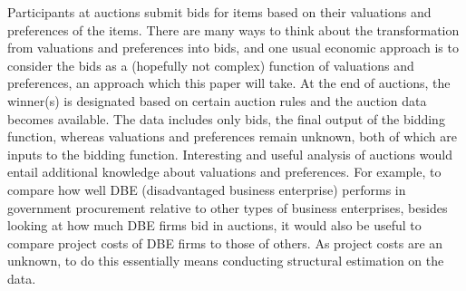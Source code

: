 \documentclass[11pt]{article}
\begin{document}




Participants at auctions submit bids for items based on their valuations and 
preferences of the items. There are many ways to think about the transformation from 
valuations and preferences into bids, and one usual economic approach is to consider 
the bids as a (hopefully not complex) function of valuations and preferences,
an approach which this paper will take. At the end of auctions, the winner(s) 
is designated based on certain auction rules and the auction data becomes available.
The data includes only bids, the final output of the bidding function, whereas 
valuations and preferences remain unknown, both of which are inputs to the 
bidding function. Interesting and useful analysis 
of auctions would entail additional knowledge about valuations and preferences.
For example, 
to compare how well DBE (disadvantaged business enterprise) performs in government 
procurement relative to other types of business enterprises, besides looking 
at how much DBE firms bid in auctions, it would also be useful to compare 
project costs of DBE firms to those of others. As project costs are an unknown,
to do this essentially means conducting structural estimation on the data.  
\end{document}
